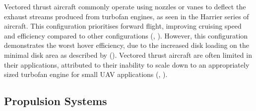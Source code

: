 Vectored thrust aircraft commonly operate using nozzles or vanes to deflect the exhaust streams produced from turbofan engines, as seen in the Harrier series of aircraft. This configuration prioritises forward flight, improving cruising speed and efficiency compared to other configurations (\citeauthor{RN15}, \citeyear{RN15}). However, this configuration demonstrates the worst hover efficiency, due to the increased disk loading on the minimal disk area as described by \citeauthor{maisel2000history} (\citeyear{maisel2000history}). Vectored thrust aircraft are often limited in their applications, attributed to their inability to scale down to an appropriately sized turbofan engine for small UAV applications (\citeauthor{RN15}, \citeyear{RN15}). 


\subsection{Propulsion Systems} 

